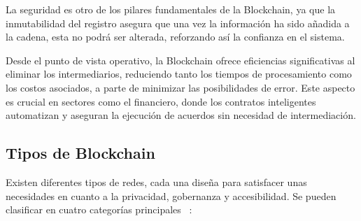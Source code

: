 La seguridad es otro de los pilares fundamentales de la Blockchain, ya que la inmutabilidad del registro asegura que una vez la información ha sido añadida a la cadena, esta no podrá ser alterada, reforzando así la confianza en el sistema. 

Desde el punto de vista operativo, la Blockchain ofrece eficiencias significativas al eliminar los intermediarios, reduciendo tanto los tiempos de procesamiento como los costos asociados, a parte de minimizar las posibilidades de error.
Este aspecto es crucial en sectores como el financiero, donde los contratos inteligentes automatizan y aseguran la ejecución de acuerdos sin necesidad de intermediación.


\subsection{Tipos de Blockchain}

Existen diferentes tipos de redes, cada una diseña para satisfacer unas necesidades en cuanto a la privacidad, gobernanza y accesibilidad. 
Se pueden clasificar en cuatro categorías principales ~\cite{introducciónBlockchain}:

